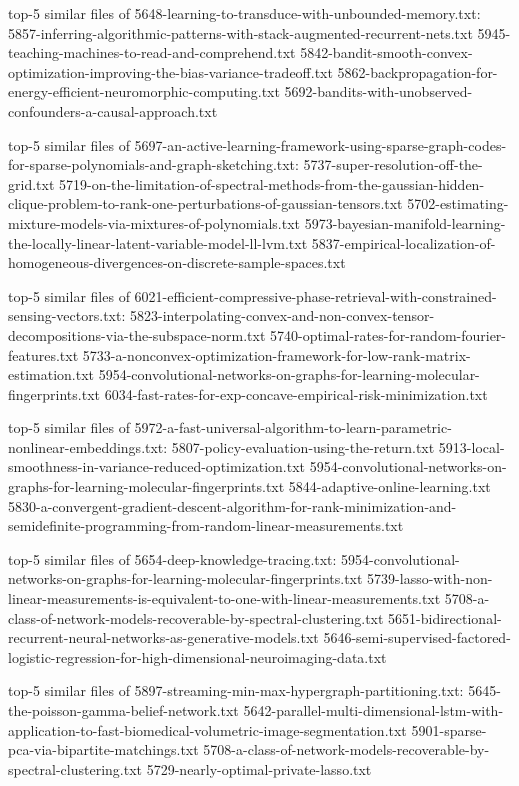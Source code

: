 \documentclass[11pt]{article}
\begin{document}
top-5 similar files of
5648-learning-to-transduce-with-unbounded-memory.txt:
5857-inferring-algorithmic-patterns-with-stack-augmented-recurrent-nets.txt
5945-teaching-machines-to-read-and-comprehend.txt
5842-bandit-smooth-convex-optimization-improving-the-bias-variance-tradeoff.txt
5862-backpropagation-for-energy-efficient-neuromorphic-computing.txt
5692-bandits-with-unobserved-confounders-a-causal-approach.txt

top-5 similar files of
5697-an-active-learning-framework-using-sparse-graph-codes-for-sparse-polynomials-and-graph-sketching.txt:
5737-super-resolution-off-the-grid.txt
5719-on-the-limitation-of-spectral-methods-from-the-gaussian-hidden-clique-problem-to-rank-one-perturbations-of-gaussian-tensors.txt
5702-estimating-mixture-models-via-mixtures-of-polynomials.txt
5973-bayesian-manifold-learning-the-locally-linear-latent-variable-model-ll-lvm.txt
5837-empirical-localization-of-homogeneous-divergences-on-discrete-sample-spaces.txt

top-5 similar files of
6021-efficient-compressive-phase-retrieval-with-constrained-sensing-vectors.txt:
5823-interpolating-convex-and-non-convex-tensor-decompositions-via-the-subspace-norm.txt
5740-optimal-rates-for-random-fourier-features.txt
5733-a-nonconvex-optimization-framework-for-low-rank-matrix-estimation.txt
5954-convolutional-networks-on-graphs-for-learning-molecular-fingerprints.txt
6034-fast-rates-for-exp-concave-empirical-risk-minimization.txt

top-5 similar files of
5972-a-fast-universal-algorithm-to-learn-parametric-nonlinear-embeddings.txt:
5807-policy-evaluation-using-the-return.txt
5913-local-smoothness-in-variance-reduced-optimization.txt
5954-convolutional-networks-on-graphs-for-learning-molecular-fingerprints.txt
5844-adaptive-online-learning.txt
5830-a-convergent-gradient-descent-algorithm-for-rank-minimization-and-semidefinite-programming-from-random-linear-measurements.txt

top-5 similar files of 5654-deep-knowledge-tracing.txt:
5954-convolutional-networks-on-graphs-for-learning-molecular-fingerprints.txt
5739-lasso-with-non-linear-measurements-is-equivalent-to-one-with-linear-measurements.txt
5708-a-class-of-network-models-recoverable-by-spectral-clustering.txt
5651-bidirectional-recurrent-neural-networks-as-generative-models.txt
5646-semi-supervised-factored-logistic-regression-for-high-dimensional-neuroimaging-data.txt

top-5 similar files of
5897-streaming-min-max-hypergraph-partitioning.txt:
5645-the-poisson-gamma-belief-network.txt
5642-parallel-multi-dimensional-lstm-with-application-to-fast-biomedical-volumetric-image-segmentation.txt
5901-sparse-pca-via-bipartite-matchings.txt
5708-a-class-of-network-models-recoverable-by-spectral-clustering.txt
5729-nearly-optimal-private-lasso.txt
\end{document}
